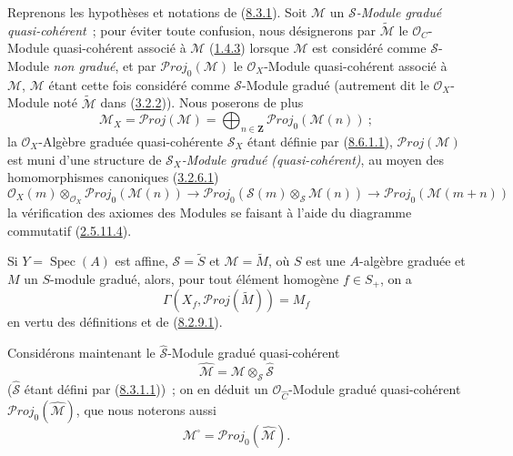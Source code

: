 \begin{env}[8.12.1]
\label{II.8.12.1-fr}
Reprenons les hypothèses et notations de
(\hyperref[II.8.3.1-fr]{8.3.1}). Soit $\mathcal{M}$ un
\emph{$\mathcal{S}$-Module gradué quasi-cohérent}~; pour éviter toute confusion,
nous désignerons par $\widetilde{\mathcal{M}}$ le $\mathcal{O}_C$-Module
quasi-cohérent associé à $\mathcal{M}$
(\hyperref[II.1.4.3-fr]{1.4.3}) lorsque $\mathcal{M}$ est considéré comme
$\mathcal{S}$-Module \emph{non gradué}, et par
$\mathcal{P}\mathit{roj}_0(\mathcal{M})$ le $\mathcal{O}_X$-Module
quasi-cohérent associé à $\mathcal{M}$, $\mathcal{M}$ étant cette fois
considéré comme $\mathcal{S}$-Module gradué (autrement dit le
$\mathcal{O}_X$-Module noté $\widetilde{\mathcal{M}}$ dans
(\hyperref[II.3.2.2-fr]{3.2.2})). Nous poserons de plus
\begin{equation}
\label{II.8.12.1.1-fr}
  \mathcal{M}_X=\mathcal{P}\mathit{roj}(\mathcal{M})
  =\bigoplus_{n\in\mathbf{Z}}\mathcal{P}\mathit{roj}_0(\mathcal{M}(n))~;
\tag{8.12.1.1}
\end{equation}
la $\mathcal{O}_X$-Algèbre graduée quasi-cohérente $\mathcal{S}_X$ étant
définie par (\hyperref[II.8.6.1.1-fr]{8.6.1.1}),
$\mathcal{P}\mathit{roj}(\mathcal{M})$ est muni d'une structure de
\emph{$\mathcal{S}_X$-Module gradué (quasi-cohérent)}, au moyen des homomorphismes
canoniques (\hyperref[II.3.2.6.1-fr]{3.2.6.1})
\begin{equation}
\label{II.8.12.1.2-fr}
  \mathcal{O}_X(m)\otimes_{\mathcal{O}_X}
  \mathcal{P}\mathit{roj}_0(\mathcal{M}(n))
  \to \mathcal{P}\mathit{roj}_0(\mathcal{S}(m)\otimes_{\mathcal{S}}\mathcal{M}(n))
  \to \mathcal{P}\mathit{roj}_0(\mathcal{M}(m+n))
\tag{8.12.1.2}
\end{equation}
la vérification des axiomes des Modules se faisant à l'aide du diagramme
commutatif (\hyperref[II.2.5.11.4-fr]{2.5.11.4}).

Si $Y=\operatorname{Spec}(A)$ est affine, $\mathcal{S}=\widetilde{S}$ et
$\mathcal{M}=\widetilde{M}$, où $S$ est une $A$-algèbre graduée et $M$ un
$S$-module gradué, alors, pour tout élément homogène $f\in S_+$, on a
\begin{equation}
\label{II.8.12.1.3-fr}
  \Gamma(X_f,\mathcal{P}\mathit{roj}(\widetilde{M}))=M_f
\tag{8.12.1.3}
\end{equation}
en vertu des définitions et de (\hyperref[II.8.2.9.1-fr]{8.2.9.1}).

Considérons maintenant le $\widehat{\mathcal{S}}$-Module gradué
quasi-cohérent
\begin{equation}
\label{II.8.12.1.4-fr}
  \widehat{\mathcal{M}}
  =\mathcal{M}\otimes_{\mathcal{S}}\widehat{\mathcal{S}}
\tag{8.12.1.4}
\end{equation}
($\widehat{\mathcal{S}}$ étant défini par
(\hyperref[II.8.3.1.1-fr]{8.3.1.1}))~; on en déduit un
$\mathcal{O}_{\widehat{C}}$-Module gradué quasi-cohérent
$\mathcal{P}\mathit{roj}_0(\widehat{\mathcal{M}})$, que nous noterons aussi
\begin{equation}
\label{II.8.12.1.5-fr}
  \mathcal{M}^{\square}=\mathcal{P}\mathit{roj}_0(\widehat{\mathcal{M}}).
\tag{8.12.1.5}
\end{equation}


\end{env}
